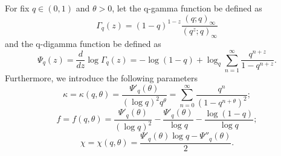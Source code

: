 \begin{definition}
For fix $q \in (0,1)$ and $\theta > 0$, let the q-gamma function be defined as $$\Gamma_q(z) = (1-q)^{1-z} \frac{(q;q)_{\infty}}{(q^z;q)_{\infty}}$$ and the q-digamma function be defined as $$\Psi_q(z) = \frac{d}{d z} \log \Gamma_q(z) = -\log(1-q) + \log_q \sum_{n=1}^{\infty} \frac{q^{n+z}}{1 - q^{n+z}}.$$
Furthermore, we introduce the following parameters
\begin{equation}
\label{def:kappa}
\kappa = \kappa(q,\theta) = \frac{\Psi'_q(\theta)}{(\log q)^2 q^{\theta}} = \sum_{n=0}^{\infty} \frac{q^n}{(1-q^{n+\theta})^2};
\end{equation}
\begin{equation}
\label{def:f}
f = f(q,\theta) = \frac{\Psi'_q(\theta)}{(\log q)^2} - \frac{\Psi'_q(\theta)}{\log q} - \frac{\log(1-q)}{\log q};
\end{equation}
\begin{equation}
\label{def:chi}
\chi = \chi(q,\theta) = \frac{\Psi'_q(\theta) \log q - \Psi''_q(\theta)}{2}.
\end{equation}
\end{definition}

